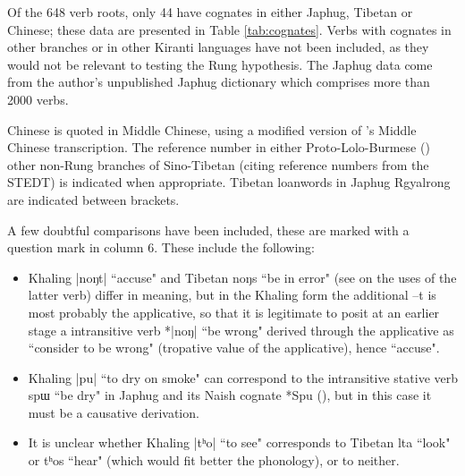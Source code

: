 \documentclass[oldfontcommands,oneside,a4paper,11pt]{article}
\newcommand{\ipa}[1]{{\phon #1}} %
\begin{document}
Of the 648 verb roots, only 44 have cognates in either Japhug, Tibetan or Chinese; these data are presented in Table \ref{tab:cognates}. Verbs with cognates in other branches or in other Kiranti languages have not been included, as they would not be relevant to testing the Rung hypothesis. The Japhug data come from the author's unpublished Japhug dictionary which comprises more than 2000 verbs.

Chinese is quoted in Middle Chinese, using a modified version of \citet{baxter92}'s Middle Chinese transcription. 
The reference number in either Proto-Lolo-Burmese (\citealt{bradley79}) other non-Rung branches of Sino-Tibetan (citing reference numbers from the STEDT) is indicated when appropriate. Tibetan loanwords in Japhug Rgyalrong are indicated between brackets.

A few doubtful comparisons have been included, these are marked with a question mark in column 6. These include the following:

\begin{itemize}
\item Khaling |noŋt| ``accuse" and Tibetan \ipa{noŋs} ``be in error" (see \citealt{hill08moriendi} on the uses of the latter verb) differ in meaning, but in the Khaling form the additional \ipa{--t} is most probably the applicative, so that it is legitimate to posit at an earlier stage a intransitive verb *|noŋ| ``be wrong" derived through the applicative as ``consider to be wrong" (tropative value of the applicative), hence ``accuse".
\item Khaling |pu| ``to dry on smoke" can correspond to the intransitive stative verb \ipa{spɯ} ``be dry" in Japhug and its Naish cognate *Spu (\citealt{jacques.michaud11naish}), but in this case it must be a causative derivation. 
\item It is unclear whether Khaling |tʰo| ``to see" corresponds to Tibetan \ipa{lta} ``look" or \ipa{tʰos} ``hear" (which would fit better the phonology), or to neither.
\end{itemize}
\end{document}
